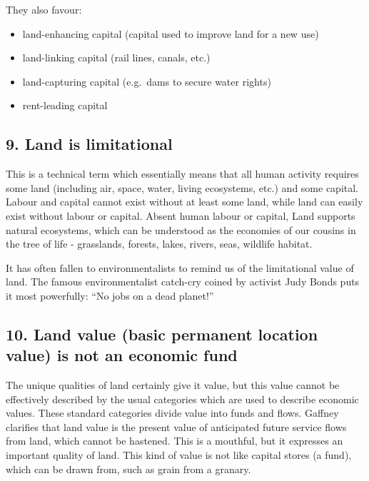 \documentclass[]{tufte-handout}
\providecommand{\tightlist}{%
  \setlength{\itemsep}{0pt}\setlength{\parskip}{0pt}}
\begin{document}
They also favour:

\begin{itemize}
\tightlist
\item
  land-enhancing capital (capital used to improve land for a new use)
\item
  land-linking capital (rail lines, canals, etc.)
\item
  land-capturing capital (e.g.~dams to secure water rights)
\item
  rent-leading capital
\end{itemize}

\hypertarget{land-is-limitational}{%
\subsection{9. Land is limitational}\label{land-is-limitational}}

This is a technical term which essentially means that all human activity
requires some land (including air, space, water, living ecosystems,
etc.) and some capital. Labour and capital cannot exist without at least
some land, while land can easily exist without labour or capital. Absent
human labour or capital, Land supports natural ecosystems, which can be
understood as the economies of our cousins in the tree of life -
grasslands, forests, lakes, rivers, seas, wildlife habitat.

It has often fallen to environmentalists to remind us of the
limitational value of land. The famous environmentalist catch-cry coined
by activist Judy Bonds puts it most powerfully: ``No jobs on a dead
planet!''

\hypertarget{land-value-basic-permanent-location-value-is-not-an-economic-fund}{%
\subsection{10. Land value (basic permanent location value) is not an
economic
fund}\label{land-value-basic-permanent-location-value-is-not-an-economic-fund}}

The unique qualities of land certainly give it value, but this value
cannot be effectively described by the usual categories which are used
to describe economic values. These standard categories divide value into
funds and flows. Gaffney clarifies that land value is the present value
of anticipated future service flows from land, which cannot be hastened.
This is a mouthful, but it expresses an important quality of land. This
kind of value is not like capital stores (a fund), which can be drawn
from, such as grain from a granary.
\end{document}
